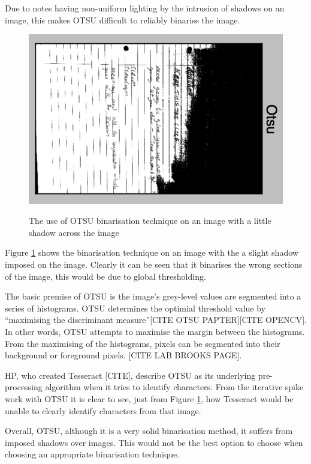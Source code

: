 Due to notes having non-uniform lighting by the intrusion of shadows on an image, this makes OTSU difficult to reliably binarise the image.

\begin{figure}[H]
  \centering
  \includegraphics{images/OTSU}
  \label{fig:OTSU}
  \caption{The use of OTSU binarisation technique on an image with a little shadow across the image}
\end{figure}

Figure \ref{fig:OTSU} shows the binarisation technique on an image with the a slight shadow imposed on the image. Clearly it can be seen that it binarises the wrong sections of the image, this would be due to global thresholding.

The basic premise of OTSU is the image's grey-level values are segmented into a series of histograms. OTSU determines the optimial threshold value by ``maximising the discriminant measure''[CITE OTSU PAPTER][CITE OPENCV]. In other words, OTSU attempts to maximise the margin between the histograms. From the maximising of the histograms, pixels can be segmented into their background or foreground pixels. [CITE LAB BROOKS PAGE].

HP, who created Tesseract [CITE], describe OTSU as its underlying pre-processing algorithm when it tries to identify characters. From the iterative spike work with OTSU it is clear to see, just from Figure \ref{fig:OTSU}, how Tesseract would be unable to clearly identify characters from that image.

Overall, OTSU, although it is a very solid binarisation method, it suffers from imposed shadows over images. This would not be the best option to choose when choosing an appropriate binarisation technique.

